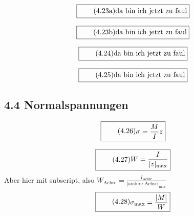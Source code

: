 \documentclass[11pt]{article}
\newcommand{\1}{ {\mathds{1}} }
\newcommand{\abs}[1]{\lvert#1\rvert}
\begin{document}
    \begin{equation}
      \boxed{
        \tag{4.23a}
        \begin{split}
          \text{da bin ich jetzt zu faul}
        \end{split}
      }
    \end{equation}

    \begin{equation}
      \boxed{
        \tag{4.23b}
        \begin{split}
          \text{da bin ich jetzt zu faul}
        \end{split}
      }
    \end{equation}

    \begin{equation}
      \boxed{
        \tag{4.24}
        \begin{split}
          \text{da bin ich jetzt zu faul}
        \end{split}
      }
    \end{equation}

    \begin{equation}
      \boxed{
        \tag{4.25}
        \begin{split}
          \text{da bin ich jetzt zu faul}
        \end{split}
      }
    \end{equation}
    
    \subsection*{4.4 Normalspannungen}

    \begin{equation}
      \boxed{
        \tag{4.26}
        \begin{split}
          \sigma
          =
          \frac{M}{I}
          z
        \end{split}
      }
    \end{equation}
    
    \begin{equation}
      \boxed{
        \tag{4.27}
        \begin{split}
          W
          =
          \frac{I}{\abs{z}_{\text{max}}}
        \end{split}
      }
    \end{equation}
    Aber hier mit subscript, also $\displaystyle W_{\text{Achse}} = \frac{I_{\text{Achse}}}{\abs{\text{andere Achse}}_{\text{max}}}$
    \begin{equation}
      \boxed{
        \tag{4.28}
        \begin{split}
          \sigma_{\text{max}}
          =
          \frac{\abs{M}}{W}
        \end{split}
      }
    \end{equation}
    
\end{document}
